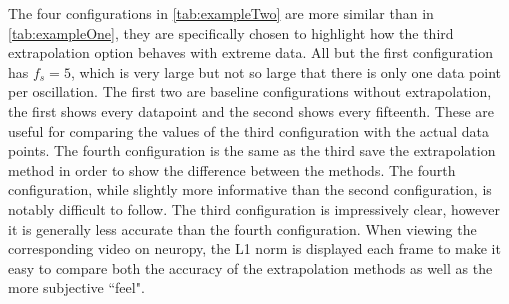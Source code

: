 The four configurations in \cref{tab:exampleTwo} are more similar than in \cref{tab:exampleOne}, they are specifically chosen to highlight how the third extrapolation option behaves with extreme data.
All but the first configuration has $f_s=5$, which is very large but not so large that there is only one data point per oscillation.
The first two are baseline configurations without extrapolation, the first shows every datapoint and the second shows every fifteenth.
These are useful for comparing the values of the third configuration with the actual data points.
The fourth configuration is the same as the third save the extrapolation method in order to show the difference between the methods.
The fourth configuration, while slightly more informative than the second configuration, is notably difficult to follow.
The third configuration is impressively clear, however it is generally less accurate than the fourth configuration.
When viewing the corresponding video on neuropy, the L1 norm is displayed each frame to make it easy to compare both the accuracy of the extrapolation methods as well as the more subjective ``feel".




